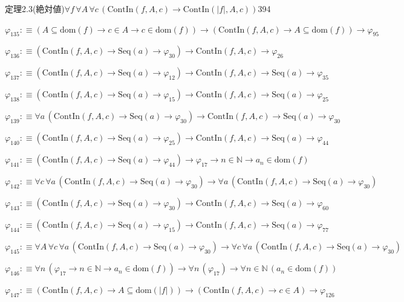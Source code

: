 \begin{fullproof}{定理2.3(絶対値)}{$\forall f\,\forall A\,\forall c\,(\mathrm{ContIn}(f,A,c) \to \mathrm{ContIn}(\lvert f \rvert,A,c))$}{394}
\begin{abbrevlist}
\item $\varphi_{135} :\equiv (A \subseteq \mathrm{dom}(f) \to c \in A \to c \in \mathrm{dom}(f)) \to (\mathrm{ContIn}(f,A,c) \to A \subseteq \mathrm{dom}(f)) \to \varphi_{95}$
\item $\varphi_{136} :\equiv (\mathrm{ContIn}(f,A,c) \to \mathrm{Seq}(a) \to \varphi_{30}) \to \mathrm{ContIn}(f,A,c) \to \varphi_{26}$
\item $\varphi_{137} :\equiv (\mathrm{ContIn}(f,A,c) \to \mathrm{Seq}(a) \to \varphi_{12}) \to \mathrm{ContIn}(f,A,c) \to \mathrm{Seq}(a) \to \varphi_{35}$
\item $\varphi_{138} :\equiv (\mathrm{ContIn}(f,A,c) \to \mathrm{Seq}(a) \to \varphi_{15}) \to \mathrm{ContIn}(f,A,c) \to \mathrm{Seq}(a) \to \varphi_{25}$
\item $\varphi_{139} :\equiv \forall a\,(\mathrm{ContIn}(f,A,c) \to \mathrm{Seq}(a) \to \varphi_{30}) \to \mathrm{ContIn}(f,A,c) \to \mathrm{Seq}(a) \to \varphi_{30}$
\item $\varphi_{140} :\equiv (\mathrm{ContIn}(f,A,c) \to \mathrm{Seq}(a) \to \varphi_{25}) \to \mathrm{ContIn}(f,A,c) \to \mathrm{Seq}(a) \to \varphi_{44}$
\item $\varphi_{141} :\equiv (\mathrm{ContIn}(f,A,c) \to \mathrm{Seq}(a) \to \varphi_{44}) \to \varphi_{17} \to n \in \mathbb{N} \to a_{n} \in \mathrm{dom}(f)$
\item $\varphi_{142} :\equiv \forall c\,\forall a\,(\mathrm{ContIn}(f,A,c) \to \mathrm{Seq}(a) \to \varphi_{30}) \to \forall a\,(\mathrm{ContIn}(f,A,c) \to \mathrm{Seq}(a) \to \varphi_{30})$
\item $\varphi_{143} :\equiv (\mathrm{ContIn}(f,A,c) \to \mathrm{Seq}(a) \to \varphi_{30}) \to \mathrm{ContIn}(f,A,c) \to \mathrm{Seq}(a) \to \varphi_{60}$
\item $\varphi_{144} :\equiv (\mathrm{ContIn}(f,A,c) \to \mathrm{Seq}(a) \to \varphi_{15}) \to \mathrm{ContIn}(f,A,c) \to \mathrm{Seq}(a) \to \varphi_{77}$
\item $\varphi_{145} :\equiv \forall A\,\forall c\,\forall a\,(\mathrm{ContIn}(f,A,c) \to \mathrm{Seq}(a) \to \varphi_{30}) \to \forall c\,\forall a\,(\mathrm{ContIn}(f,A,c) \to \mathrm{Seq}(a) \to \varphi_{30})$
\item $\varphi_{146} :\equiv \forall n\,(\varphi_{17} \to n \in \mathbb{N} \to a_{n} \in \mathrm{dom}(f)) \to \forall n\,(\varphi_{17}) \to \forall n \in \mathbb{N}\,(a_{n} \in \mathrm{dom}(f))$
\item $\varphi_{147} :\equiv (\mathrm{ContIn}(f,A,c) \to A \subseteq \mathrm{dom}(\lvert f \rvert)) \to (\mathrm{ContIn}(f,A,c) \to c \in A) \to \varphi_{126}$

\end{abbrevlist}
\end{fullproof}
